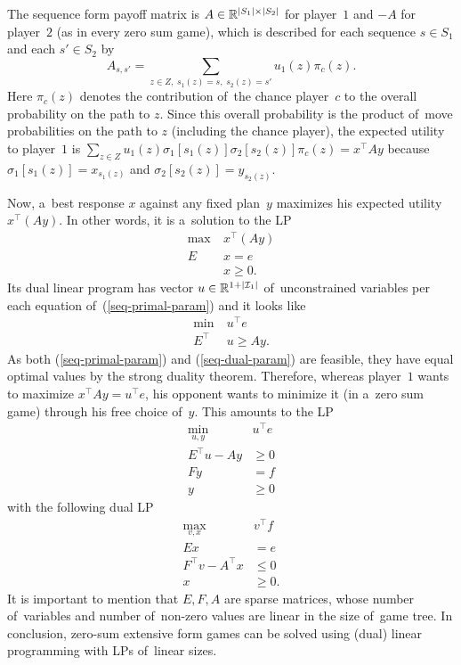The sequence form payoff matrix is $A \in \mathbb{R} ^{\left\vert S_1 \right\vert \times \left\vert S_2 \right\vert}$ for player~$1$ and $-A$ for player~$2$ (as in every zero sum game), which is described for each sequence $s \in S_1$ and each $s' \in S_2$ by
\[
    A _{s,s'} = \sum _{z \in Z,\; s_1(z) = s,\; s_2(z) = s'} u_1(z) \pi_c (z).
\]
Here $\pi_c (z)$ denotes the contribution of~the chance player~$c$ to the overall probability on the path to $z$.
Since this overall probability is the product of~move probabilities on the path to $z$ (including the chance player), the expected utility to player~$1$ is
$
    \sum _{z \in Z} u_1(z) \sigma_1 [s_1(z)] \sigma_2 [s_2(z)] \pi_c (z)
    = x ^\top A y
$
because $\sigma_1 [s_1(z)] = x _{s_1(z)}$ and $\sigma_2 [s_2(z)] = y _{s_2(z)}$.

Now, a~best response $x$ against any fixed plan~$y$ maximizes his expected utility $x ^\top (Ay)$.
In other words, it is a~solution to the LP
\begin{equation}
\label{seq-primal-param}
\begin{split}
    \max\  &x^\top (Ay) \\
    E&x = e \\
    &x \ge 0.
\end{split}
\end{equation}
Its dual linear program has vector $u \in \mathbb{R}^{1 + \left\vert \mathcal{I}_1 \right\vert}$ of~unconstrained variables per each equation of~(\ref{seq-primal-param}) and it looks like
\begin{equation}
\label{seq-dual-param}
\begin{split}
    \min\  &u^\top e \\
    E^\top &u \ge Ay.
\end{split}
\end{equation}
As both (\ref{seq-primal-param}) and (\ref{seq-dual-param}) are feasible, they have equal optimal values by the strong duality theorem.
Therefore, whereas player~$1$ wants to maximize $x^\top Ay = u^\top e$, his opponent wants to minimize it (in a~zero sum game) through his free choice of~$y$.
This amounts to the LP
\begin{equation}
\label{seq-dual}
\begin{split}
    \min_{u, y}\  &u^\top e \\
    E^\top u - Ay &\ge 0 \\
    Fy &= f \\
    y &\ge 0
\end{split}
\end{equation}
with the following dual LP
\begin{equation}
\label{seq-primal}
\begin{split}
    \max_{v, x}\  &v^\top f \\
    Ex &= e \\
    F^\top v - A^\top x &\le 0 \\
    x &\ge 0.
\end{split}
\end{equation}
It is important to mention that $E, F, A$ are sparse matrices, whose number of~variables and number of~non-zero values are linear in the size of~game tree.
In conclusion, zero-sum extensive form games can be solved using (dual) linear programming with LPs of~linear sizes.


